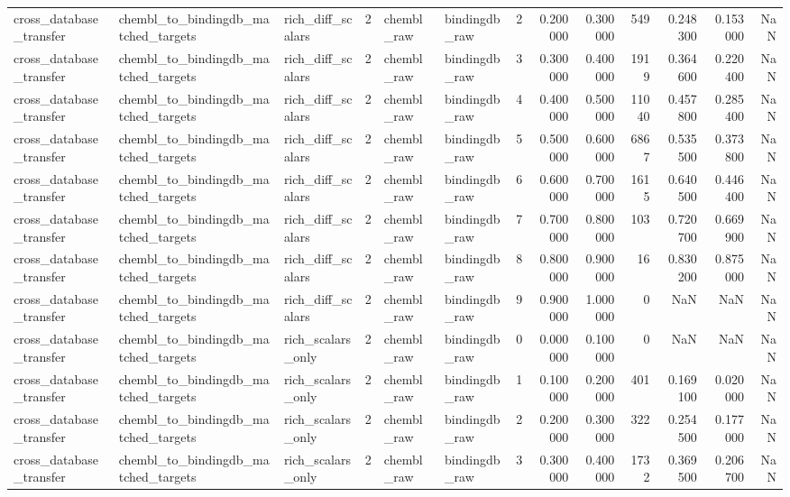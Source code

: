 \begin{longtable}{lllrllrrrrrrr}
cross\_database\_transfer & chembl\_to\_bindingdb\_matched\_targets & rich\_diff\_scalars & 2 & chembl\_raw & bindingdb\_raw & 2 & 0.200000 & 0.300000 & 549 & 0.248300 & 0.153000 & NaN \\
cross\_database\_transfer & chembl\_to\_bindingdb\_matched\_targets & rich\_diff\_scalars & 2 & chembl\_raw & bindingdb\_raw & 3 & 0.300000 & 0.400000 & 1919 & 0.364600 & 0.220400 & NaN \\
cross\_database\_transfer & chembl\_to\_bindingdb\_matched\_targets & rich\_diff\_scalars & 2 & chembl\_raw & bindingdb\_raw & 4 & 0.400000 & 0.500000 & 11040 & 0.457800 & 0.285400 & NaN \\
cross\_database\_transfer & chembl\_to\_bindingdb\_matched\_targets & rich\_diff\_scalars & 2 & chembl\_raw & bindingdb\_raw & 5 & 0.500000 & 0.600000 & 6867 & 0.535500 & 0.373800 & NaN \\
cross\_database\_transfer & chembl\_to\_bindingdb\_matched\_targets & rich\_diff\_scalars & 2 & chembl\_raw & bindingdb\_raw & 6 & 0.600000 & 0.700000 & 1615 & 0.640500 & 0.446400 & NaN \\
cross\_database\_transfer & chembl\_to\_bindingdb\_matched\_targets & rich\_diff\_scalars & 2 & chembl\_raw & bindingdb\_raw & 7 & 0.700000 & 0.800000 & 103 & 0.720700 & 0.669900 & NaN \\
cross\_database\_transfer & chembl\_to\_bindingdb\_matched\_targets & rich\_diff\_scalars & 2 & chembl\_raw & bindingdb\_raw & 8 & 0.800000 & 0.900000 & 16 & 0.830200 & 0.875000 & NaN \\
cross\_database\_transfer & chembl\_to\_bindingdb\_matched\_targets & rich\_diff\_scalars & 2 & chembl\_raw & bindingdb\_raw & 9 & 0.900000 & 1.000000 & 0 & NaN & NaN & NaN \\
cross\_database\_transfer & chembl\_to\_bindingdb\_matched\_targets & rich\_scalars\_only & 2 & chembl\_raw & bindingdb\_raw & 0 & 0.000000 & 0.100000 & 0 & NaN & NaN & NaN \\
cross\_database\_transfer & chembl\_to\_bindingdb\_matched\_targets & rich\_scalars\_only & 2 & chembl\_raw & bindingdb\_raw & 1 & 0.100000 & 0.200000 & 401 & 0.169100 & 0.020000 & NaN \\
cross\_database\_transfer & chembl\_to\_bindingdb\_matched\_targets & rich\_scalars\_only & 2 & chembl\_raw & bindingdb\_raw & 2 & 0.200000 & 0.300000 & 322 & 0.254500 & 0.177000 & NaN \\
cross\_database\_transfer & chembl\_to\_bindingdb\_matched\_targets & rich\_scalars\_only & 2 & chembl\_raw & bindingdb\_raw & 3 & 0.300000 & 0.400000 & 1732 & 0.369500 & 0.206700 & NaN \\

\end{longtable}

